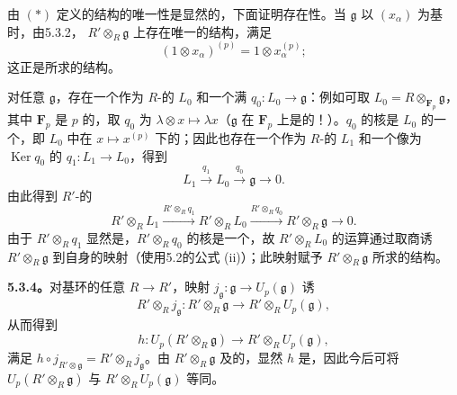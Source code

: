 由 $(*)$ 定义的结构的唯一性是显然的，下面证明存在性。当 $\mathfrak g$ 以 $(x_\alpha)$ 为基时，由5.3.2， $R'\otimes_R\mathfrak g$ 上存在唯一的结构，满足
\[
 (1\otimes x_\alpha)^{(p)}=1\otimes x_\alpha^{(p)};
\]
这正是所求的结构。

对任意 $\mathfrak g$，存在一个作为 $R$-的 $L_0$ 和一个满 $q_0:L_0\to\mathfrak g$：例如可取 $L_0=R\otimes_{\mathbf F_p}\mathfrak g$，其中 $\mathbf F_p$ 是 $p$ 的，取 $q_0$ 为 $\lambda\otimes x\mapsto\lambda x$（$\mathfrak g$ 在 $\mathbf F_p$ 上是的！）。$q_0$ 的核是 $L_0$ 的一个，即 $L_0$ 中在 $x\mapsto x^{(p)}$ 下的；因此也存在一个作为 $R$-的 $L_1$ 和一个像为 $\operatorname{Ker}q_0$ 的 $q_1:L_1\to L_0$，得到
\[
 L_1\xrightarrow{q_1}L_0\xrightarrow{q_0}\mathfrak g\longrightarrow0.
\]
由此得到 $R'$-的
\[
 R'\otimes_RL_1\xrightarrow{R'\otimes_Rq_1}R'\otimes_RL_0
 \xrightarrow{R'\otimes_Rq_0}R'\otimes_R\mathfrak g\longrightarrow0.
\]
由于 $R'\otimes_Rq_1$ 显然是，$R'\otimes_Rq_0$ 的核是一个，故 $R'\otimes_RL_0$ 的运算通过取商诱 $R'\otimes_R\mathfrak g$ 到自身的映射（使用5.2的公式 (ii)）；此映射赋予 $R'\otimes_R\mathfrak g$ 所求的结构。

\textbf{5.3.4。}对基环的任意 $R\to R'$，映射 $j_{\mathfrak g}:\mathfrak g\to U_p(\mathfrak g)$ 诱
\[
 R'\otimes_Rj_{\mathfrak g}:R'\otimes_R\mathfrak g\longrightarrow R'\otimes_RU_p(\mathfrak g),
\]
从而得到
\[
 h:U_p(R'\otimes_R\mathfrak g)\longrightarrow R'\otimes_RU_p(\mathfrak g),
\]
满足 $h\circ j_{R'\otimes\mathfrak g}=R'\otimes_Rj_{\mathfrak g}$。由 $R'\otimes_R\mathfrak g$ 及的，显然 $h$ 是，因此今后可将 $U_p(R'\otimes_R\mathfrak g)$ 与 $R'\otimes_RU_p(\mathfrak g)$ 等同。

